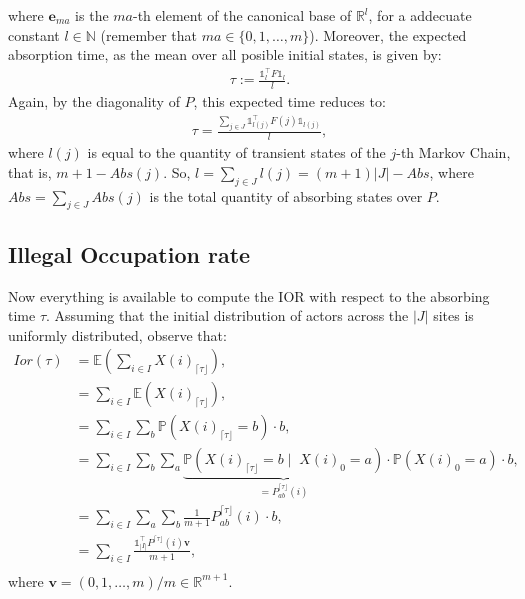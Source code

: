 \documentclass{article}
\newcommand{\p}{\mathds{P}}
\newcommand{\E}{\mathds{E}}
\newcommand{\vv}{\mathbf{v}}
\newcommand{\e}{\mathbf{e}}
\begin{document}
where $\e_{ma}$ is the $ma$-th element of the canonical base of $\mathbb{R}^l$, for a addecuate constant $l \in \mathds{N}$ (remember that $ma \in \{0, 1, \dots , m\}$). Moreover, the expected absorption time, as the mean over all posible initial states, is given by:
\begin{align*}
	\tau := \frac{\mathbb{1}_l^{\top}F \mathbb{1}_l}{l}.
\end{align*}
Again, by the diagonality of $P$, this expected time reduces to:
\begin{align*}
	\tau = \frac{\sum_{j \in J}\mathbb{1}_{l(j)}^{\top}F(j) \mathbb{1}_{l(j)}}{l},
\end{align*}
where $l(j)$ is equal to the quantity of transient states of the $j$-th Markov Chain, that is, $m+1 - Abs(j)$. So, $l = \sum\limits_{j \in J} l(j) = (m+1)|J|- Abs$, where $Abs = \sum\limits_{j \in J} Abs(j)$ is the total quantity of absorbing states over $P$.\par

\subsection{Illegal Occupation rate}
Now everything is available to compute the IOR with respect to the absorbing time $\tau$. Assuming that the initial distribution of actors across the $|J|$ sites is uniformly distributed, observe that:
\begin{align*}
	Ior(\tau) 	&= \E\left(\sum\limits_{i \in I} X(i)_{\lceil \tau \rfloor}\right),\\
				&= \sum\limits_{i \in I} \E(X(i)_{\lceil \tau \rfloor}),\\
				&= \sum\limits_{i \in I} \sum\limits_{b} \p(X(i)_{\lceil \tau \rfloor} = b)\cdot b,\\
				&= \sum\limits_{i \in I} \sum\limits_{b}\sum\limits_{a} \underbrace{\p(X(i)_{\lceil \tau \rfloor} = b \; \vert \;\;X(i)_{0} = a)}_{ = P^{{\lceil \tau \rfloor}}_{ab}(i)} \cdot \p(X(i)_0 = a)\cdot b,\\
				&= \sum\limits_{i \in I} \sum\limits_{a}\sum\limits_{b} \frac{1}{m+1}P^{{\lceil \tau \rfloor}}_{ab}(i)\cdot b,\\
				&= \sum\limits_{i \in I} \frac{\mathbb{1}_{|I|}^{\top}P^{{\lceil \tau \rfloor}}(i)\vv}{m+1},\\
\end{align*}
where $\vv = (0, 1, \dots, m)/m \in \mathds{R}^{m+1}$.\par
\end{document}

